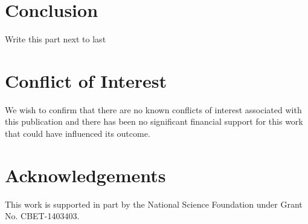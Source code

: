 \documentclass[preprint,12pt, a4paper]{elsarticle}
\begin{document}
\section{Conclusion}
\label{sec:conclusion}

Write this part next to last

\section{Conflict of Interest}
%

We wish to confirm that there are no known conflicts of interest associated with this publication and there has been no significant financial support for this work that could have influenced its outcome.

\section*{Acknowledgements}
\label{acknoledgements}

This work is supported in part by the National Science Foundation under Grant No. CBET-1403403.



\end{document}
